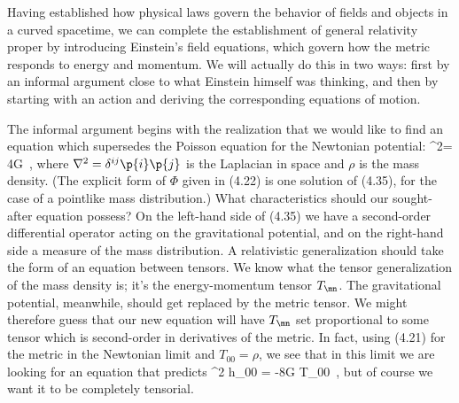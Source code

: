 \documentclass[12pt]{article}
\begin{document}
Having established how physical laws govern the behavior of
fields and objects in a curved spacetime, we can complete the
establishment of general relativity proper by introducing Einstein's
field equations, which govern how the metric responds to energy
and momentum.  We will actually do this in two ways: first by an
informal argument close to what Einstein himself was thinking,
and then by starting with an action and deriving the 
corresponding equations of motion.

The informal argument begins with the realization that we would 
like to find an equation which supersedes the Poisson equation for
the Newtonian potential:
\be
  \nabla^2\Phi = 4\pi G\rho\ ,\label{4.35}
\ee
where $\nabla^2 = \delta^{ij}\p{i}\p{j}$ is the Laplacian in 
space and $\rho$ is the mass density.  (The explicit form of
$\Phi$ given in (4.22) is one solution of (4.35),
for the case of a pointlike mass distribution.)  What characteristics
should our sought-after equation possess?  On the left-hand side
of (4.35) we have a second-order differential operator acting on the
gravitational potential, and on the right-hand side a measure of
the mass distribution.  A relativistic generalization should take
the form of an equation between tensors.  We know what the tensor
generalization of the mass density is; it's the energy-momentum
tensor $T_\mn$.  The gravitational potential, meanwhile, should
get replaced by the metric tensor.  We might therefore guess
that our new equation will have $T_\mn$ set proportional to some
tensor which is second-order in derivatives of the metric.  In
fact, using (4.21) for the metric in the Newtonian limit and
$T_{00}=\rho$, we see that in this limit we are looking for an
equation that predicts
\be
  \nabla^2 h_{00} = -8\pi G T_{00}\ ,\label{4.36}
\ee
but of course we want it to be completely tensorial.
\end{document}
